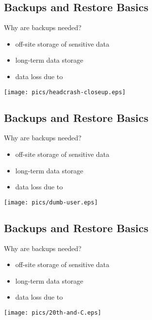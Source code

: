 \documentclass[xga]{xdvislides}
\begin{document}
\subsection{Backups and Restore Basics}
Why are backups needed?
\begin{itemize}
	\item off-site storage of sensitive data
	\item long-term data storage
	\item data loss due to
\end{itemize}
\vspace*{\fill}
\begin{center}
	\texttt{[image: pics/headcrash-closeup.eps]}
\end{center}
\vspace*{\fill}

\subsection{Backups and Restore Basics}
Why are backups needed?
\begin{itemize}
	\item off-site storage of sensitive data
	\item long-term data storage
	\item data loss due to
\end{itemize}
\vspace*{\fill}
\begin{center}
	\texttt{[image: pics/dumb-user.eps]}
\end{center}
\vspace*{\fill}

\subsection{Backups and Restore Basics}
Why are backups needed?
\begin{itemize}
	\item off-site storage of sensitive data
	\item long-term data storage
	\item data loss due to
\end{itemize}
\vspace*{\fill}
\begin{center}
	\texttt{[image: pics/20th-and-C.eps]}
\end{center}
\vspace*{\fill}
\end{document}
